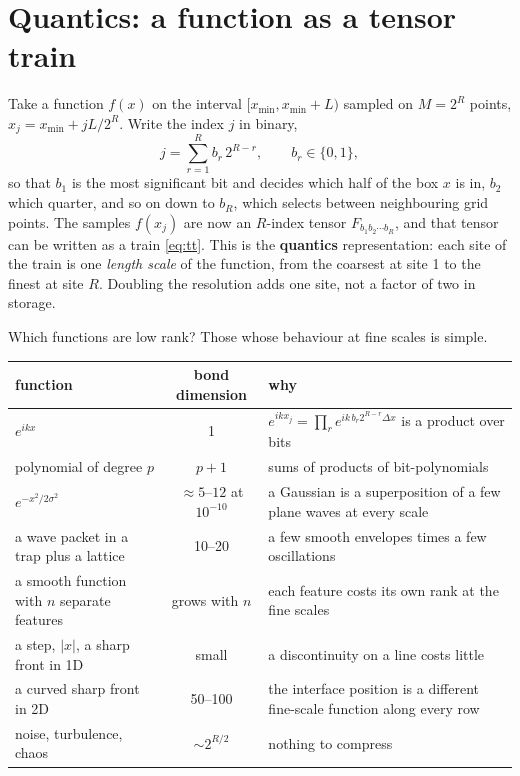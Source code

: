 \documentclass[11pt,a4paper]{article}
\begin{document}
\section{Quantics: a function as a tensor train}
\label{sec:quantics}

Take a function $f(x)$ on the interval $[x_{\min},x_{\min}+L)$ sampled on $M=2^R$
points, $x_j=x_{\min}+jL/2^R$. Write the index $j$ in binary,
\begin{equation}
j=\sum_{r=1}^{R} b_r\,2^{R-r},\qquad b_r\in\{0,1\},
\end{equation}
so that $b_1$ is the most significant bit and decides which half of the box $x$ is in,
$b_2$ which quarter, and so on down to $b_R$, which selects between neighbouring grid
points. The samples $f(x_j)$ are now an $R$-index tensor $F_{b_1b_2\cdots b_R}$, and
that tensor can be written as a train \eqref{eq:tt}. This is the \textbf{quantics}
representation: each site of the train is one \emph{length scale} of the function,
from the coarsest at site 1 to the finest at site $R$. Doubling the resolution adds one
site, not a factor of two in storage.

Which functions are low rank? Those whose behaviour at fine scales is simple.

\begin{tabularx}{\textwidth}{@{}lcL@{}}
\toprule
function & bond dimension & why \\
\midrule
$e^{ikx}$ & 1 & $e^{ikx_j}=\prod_r e^{ik\,b_r 2^{R-r}\Delta x}$ is a product over bits \\
polynomial of degree $p$ & $p+1$ & sums of products of bit-polynomials \\
$e^{-x^2/2\sigma^2}$ & $\approx 5$--$12$ at $10^{-10}$ & a Gaussian is a superposition of a few plane waves at every scale \\
a wave packet in a trap plus a lattice & 10--20 & a few smooth envelopes times a few oscillations \\
a smooth function with $n$ separate features & grows with $n$ & each feature costs its own rank at the fine scales \\
a step, $|x|$, a sharp front in 1D & small & a discontinuity on a line costs little \\
a curved sharp front in 2D & 50--100 & the interface position is a different fine-scale function along every row \\
noise, turbulence, chaos & $\sim 2^{R/2}$ & nothing to compress \\
\bottomrule
\end{tabularx}
\end{document}

